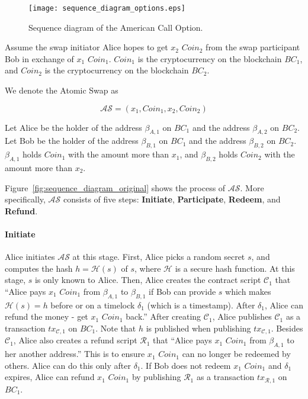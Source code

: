 \begin{figure}
    \texttt{[image: sequence\_diagram\_options.eps]}
    \caption{Sequence diagram of the American Call Option.}
    \label{fig:sequence_diagram_option}
\end{figure}



Assume the swap initiator Alice hopes to get $x_2$ $Coin_2$ from the swap participant Bob in exchange of $x_1$ $Coin_1$. 
$Coin_1$ is the cryptocurrency on the blockchain $BC_1$, and $Coin_2$ is the cryptocurrency on the blockchain $BC_2$.

We denote the Atomic Swap as 

$$\mathcal{AS} = (x_1, Coin_1, x_2, Coin_2)$$

Let Alice be the holder of the address $\beta_{A, 1}$ on $BC_1$ and the address $\beta_{A, 2}$ on $BC_2$.
Let Bob be the holder of the address $\beta_{B, 1}$ on $BC_1$ and the address $\beta_{B, 2}$ on $BC_2$.
$\beta_{A, 1}$ holds $Coin_1$ with the amount more than $x_1$, and $\beta_{B, 2}$ holds $Coin_2$ with the amount more than $x_2$.

Figure~\ref{fig:sequence_diagram_original} shows the process of $\mathcal{AS}$.
More specifically, $\mathcal{AS}$ consists of five steps:
\textbf{Initiate},
\textbf{Participate},
\textbf{Redeem}, and
\textbf{Refund}.


\paragraph{\textbf{Initiate}}
Alice initiates $\mathcal{AS}$ at this stage.
First, Alice picks a random secret $s$, and computes the hash $h = \mathcal{H}(s)$ of $s$, where $\mathcal{H}$ is a secure hash function.
At this stage, $s$ is only known to Alice.
Then, Alice creates the contract script $\mathcal{C}_1$ that ``Alice pays $x_1$ $Coin_1$ from $\beta_{A, 1}$ to $\beta_{B, 1}$ if Bob can provide $s$ which makes $\mathcal{H}(s) = h$ before or on a timelock $\delta_1$ (which is a timestamp). After $\delta_1$, Alice can refund the money - get $x_1$ $Coin_1$ back.''
After creating $\mathcal{C}_1$, Alice publishes $\mathcal{C}_1$ as a transaction $tx_{\mathcal{C}, 1}$ on $BC_1$.
Note that $h$ is published when publishing $tx_{\mathcal{C}, 1}$.
Besides $\mathcal{C}_1$, Alice also creates a refund script $\mathcal{R}_1$ that ``Alice pays $x_1$ $Coin_1$ from $\beta_{A, 1}$ to her another address.'' This is to ensure $x_1$ $Coin_1$ can no longer be redeemed by others. Alice can do this only after $\delta_1$.
If Bob does not redeem $x_1$ $Coin_1$ and $\delta_1$ expires, Alice can refund $x_1$ $Coin_1$ by publishing $\mathcal{R}_1$ as a transaction $tx_{\mathcal{R}, 1}$ on $BC_1$.


